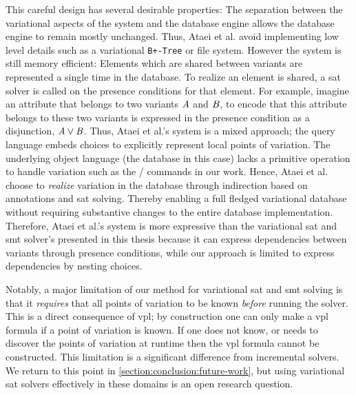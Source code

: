 This careful design has several desirable properties: The separation between the
variational aspects of the system and the database engine allows the database
engine to remain mostly unchanged. Thus, Ataei et al. avoid implementing low
level details such as a variational \texttt{B+-Tree} or file system. However the
system is still memory efficient: Elements which are shared between variants are
represented a single time in the database. To realize an element is shared, a
\ac{sat} solver is called on the presence conditions for that element. For
example, imagine an attribute that belongs to two variants $\mathit{A}$ and
$\mathit{B}$, to encode that this attribute belongs to these two variants is
expressed in the presence condition as a disjunction, $\mathit{A \vee B}$. Thus,
Ataei et al.'s system is a mixed approach; the query language embeds choices to
explicitly represent local points of variation. The underlying object language
(the database in this case) lacks a primitive operation to handle variation such
as the / commands in our work. Hence, Ataei et al. choose to
\emph{realize} variation in the database through indirection based on
annotations and \ac{sat} solving. Thereby enabling a full fledged variational
database without requiring substantive changes to the entire database
implementation. Therefore, Ataei et al.'s system is more expressive than the
variational \ac{sat} and \ac{smt} solver's presented in this thesis because it
can express dependencies between variants through presence conditions, while our
approach is limited to express dependencies by nesting choices.

Notably, a major limitation of our method for variational \ac{sat} and \ac{smt}
solving is that it \emph{requires} that all points of variation to be known
\emph{before} running the solver. This is a direct consequence of \ac{vpl}; by
construction one can only make a \ac{vpl} formula if a point of variation is
known. If one does not know, or needs to discover the points of variation at
runtime then the \ac{vpl} formula cannot be constructed. This limitation is a
significant difference from incremental solvers. We return to this point in
\autoref{section:conclusion:future-work}, but using variational \ac{sat} solvers
effectively in these domains is an open research question.


